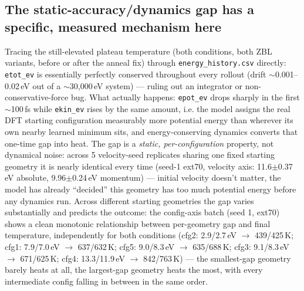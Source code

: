 \documentclass[11pt]{article}
\begin{document}
\subsection{The static-accuracy/dynamics gap has a specific, measured mechanism here}
\label{sec:q4-epot-gap}

Tracing the still-elevated plateau temperature (both conditions, both ZBL
variants, before or after the anneal fix) through
\texttt{energy\_history.csv} directly: \texttt{etot\_ev} is essentially
perfectly conserved throughout every rollout (drift $\sim$0.001--0.02\,eV
out of a $\sim$30{,}000\,eV system) --- ruling out an integrator or
non-conservative-force bug. What actually happens: \texttt{epot\_ev} drops
sharply in the first $\sim$100\,fs while \texttt{ekin\_ev} rises by the same
amount, i.e. the model assigns the real DFT starting configuration
measurably more potential energy than wherever its own nearby learned
minimum sits, and energy-conserving dynamics converts that one-time gap
into heat. The gap is a \emph{static, per-configuration} property, not
dynamical noise: across 5 velocity-seed replicates sharing one fixed
starting geometry it is nearly identical every time (seed-1 ext70, velocity
axis: 11.6$\pm$0.37\,eV absolute, 9.96$\pm$0.24\,eV momentum) --- initial
velocity doesn't matter, the model has already ``decided'' this geometry
has too much potential energy before any dynamics run. Across different
starting geometries the gap varies substantially and predicts the outcome:
the config-axis batch (seed 1, ext70) shows a clean monotonic relationship
between per-geometry gap and final temperature, independently for both
conditions (cfg2: 2.9/2.7\,eV $\to$ 439/425\,K; cfg1: 7.9/7.0\,eV $\to$
637/632\,K; cfg5: 9.0/8.3\,eV $\to$ 635/688\,K; cfg3: 9.1/8.3\,eV $\to$
671/625\,K; cfg4: 13.3/11.9\,eV $\to$ 842/763\,K) --- the smallest-gap
geometry barely heats at all, the largest-gap geometry heats the most, with
every intermediate config falling in between in the same order.
\end{document}
